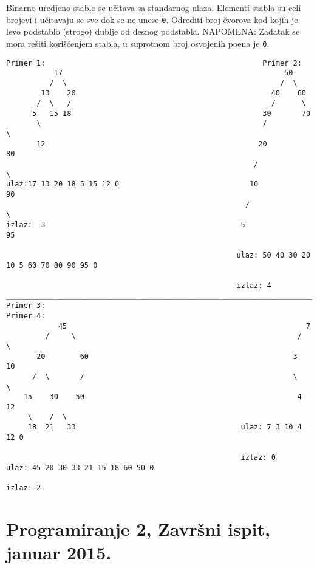 \begin{z}
Binarno uredjeno stablo se u\v citava sa standarnog ulaza. Elementi stabla su celi brojevi
i u\v citavaju se sve dok se ne unese {\tt 0}.
Odrediti broj \v cvorova kod kojih je levo podstablo (strogo) dublje od desnog podstabla.
NAPOMENA: Zadatak se mora re\v siti kori\v s\'cenjem stabla, u suprotnom broj osvojenih poena je {\tt 0}.
\end{z}
\begin{verbatim}
Primer 1:                                                  Primer 2:
           17                                                   50
          /  \                                                 /  \
        13    20                                             40    60
       /  \   /                                              /      \
      5   15 18                                            30       70
       \                                                   /          \
       12                                                 20          80
                                                         /              \
ulaz:17 13 20 18 5 15 12 0                              10              90
                                                       /                  \
izlaz:  3                                             5                   95

                                                     ulaz: 50 40 30 20 10 5 60 70 80 90 95 0

                                                     izlaz: 4
________________________________________________________________________________________________
Primer 3:                                                        Primer 4:
            45                                                       7
         /     \                                                   /   \
       20        60                                               3     10
      /  \       /                                                \       \
    15    30    50                                                 4       12
     \    /  \
     18  21   33                                      ulaz: 7 3 10 4 12 0

                                                      izlaz: 0
ulaz: 45 20 30 33 21 15 18 60 50 0

izlaz: 2
\end{verbatim}


\section{Programiranje 2, Zavr\v{s}ni ispit, januar 2015.}


